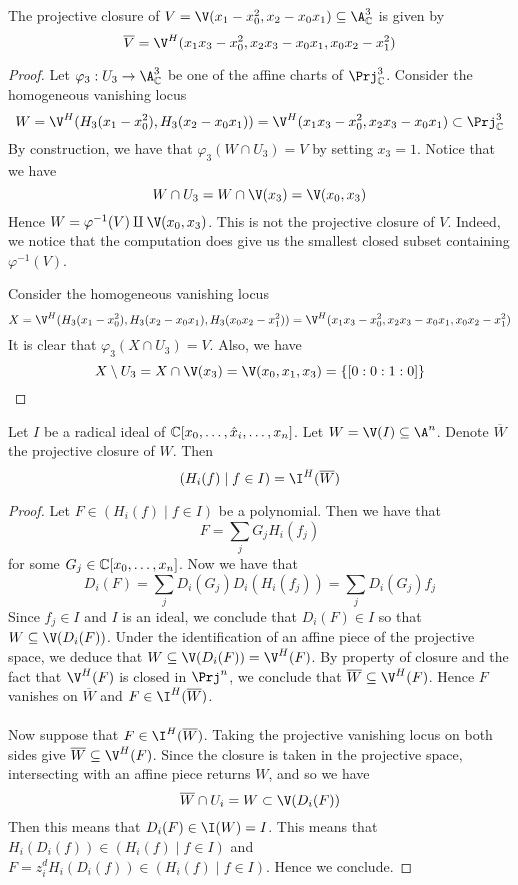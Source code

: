 \documentclass[a4paper]{article}
\begin{document}
\begin{eg}{}{} The projective closure of $V=\V(x_1-x_0^2,x_2-x_0x_1)\subseteq\A_\C^3$ is given by $$\overline{V}=\V^H(x_1x_3-x_0^2,x_2x_3-x_0x_1,x_0x_2-x_1^2)$$ 
\begin{proof}
Let $\varphi_3:U_3\to\A_\C^3$ be one of the affine charts of $\Prj_\C^3$. Consider the homogeneous vanishing locus $$W=\V^H(H_3(x_1-x_0^2),H_3(x_2-x_0x_1))=\V^H(x_1x_3-x_0^2, x_2x_3-x_0x_1)\subset\Prj_\C^3$$ By construction, we have that $\varphi_3(W\cap U_3)=V$ by setting $x_3=1$. Notice that we have $$W\cap U_3=W\cap\V(x_3)=\V(x_0,x_3)$$ Hence $W=\varphi^{-1}(V)\amalg\V(x_0,x_3)$. This is not the projective closure of $V$. Indeed, we notice that the computation does give us the smallest closed subset containing $\varphi^{-1}(V)$. 

Consider the homogeneous vanishing locus $$X=\V^H(H_3(x_1-x_0^2),H_3(x_2-x_0x_1),H_3(x_0x_2-x_1^2))=\V^H(x_1x_3-x_0^2,x_2x_3-x_0x_1,x_0x_2-x_1^2)$$ It is clear that $\varphi_3(X\cap U_3)=V$. Also, we have $$X\setminus U_3=X\cap\V(x_3)=\V(x_0,x_1,x_3)=\{[0:0:1:0]\}$$
\end{proof}
\end{eg}

\begin{prp}{}{} Let $I$ be a radical ideal of $\mathbb{C}[x_0,\dots,\hat{x}_i,\dots,x_n]$. Let $W=\V(I)\subseteq\A^n$. Denote $\overline{W}$ the projective closure of $W$. Then $$(H_i(f)\;|\;f\in I)=\I^H(\overline{W})$$ 
\begin{proof}
Let $F\in(H_i(f)\;|\;f\in I)$ be a polynomial. Then we have that $$F=\sum_j G_jH_i(f_j)$$ for some $G_j\in\mathbb{C}[x_0,\dots,x_n]$. Now we have that $$D_i(F)=\sum_jD_i(G_j)D_i(H_i(f_j))=\sum_jD_i(G_j)f_j$$ Since $f_j\in I$ and $I$ is an ideal, we conclude that $D_i(F)\in I$ so that $W\subseteq\V(D_i(F))$. Under the identification of an affine piece of the projective space, we deduce that $W\subseteq\V(D_i(F))=\V^H(F)$. By property of closure and the fact that $\V^H(F)$ is closed in $\Prj^n$, we conclude that $\overline{W}\subseteq\V^H(F)$. Hence $F$ vanishes on $\overline{W}$ and $F\in\I^H(\overline{W})$. \\~\\

Now suppose that $F\in\I^H(\overline{W})$. Taking the projective vanishing locus on both sides give $\overline{W}\subseteq\V^H(F)$. Since the closure is taken in the projective space, intersecting with an affine piece returns $W$, and so we have $$\overline{W}\cap U_i=W\subset\V(D_i(F))$$ Then this means that $D_i(F)\in\I(W)=I$. This means that $H_i(D_i(f))\in(H_i(f)\;|\;f\in I)$ and $F=z_i^dH_i(D_i(f))\in(H_i(f)\;|\;f\in I)$. Hence we conclude. 
\end{proof}
\end{prp}
\end{document}
